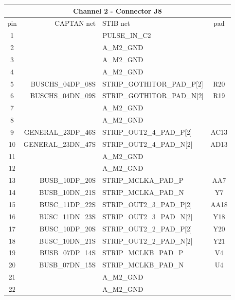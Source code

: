 \documentclass[11pt]{article}
\begin{document}
\begin{table}
\begin{center}
\scriptsize
\begin{tabular}{|c|r|l|c|} \hline
\multicolumn{4}{|c|}{Channel 2 - Connector J8} \\ \hline
pin & CAPTAN net    & STIB net & pad \\ \hline\hline
 1 &                  &  PULSE\_IN\_C2            & \\
 2 &                  &  A\_M2\_GND               & \\ \hline
 3 &                  &  A\_M2\_GND               & \\
 4 &                  &  A\_M2\_GND               & \\ \hline
 5 &  BUSCHS\_04DP\_08S &  STRIP\_GOTHITOR\_PAD\_P[2] & R20 \\
 6 &  BUSCHS\_04DN\_09S &  STRIP\_GOTHITOR\_PAD\_N[2] & R19 \\ \hline
 7 &                  &  A\_M2\_GND               & \\
 8 &                  &  A\_M2\_GND               & \\ \hline
 9 & GENERAL\_23DP\_46S &  STRIP\_OUT2\_4\_PAD\_P[2]   & AC13 \\
10 & GENERAL\_23DN\_47S &  STRIP\_OUT2\_4\_PAD\_N[2]   & AD13 \\ \hline
11 &                  &  A\_M2\_GND               & \\
12 &                  &  A\_M2\_GND               & \\ \hline
13 &    BUSB\_10DP\_20S &  STRIP\_MCLKA\_PAD\_P       & AA7 \\
14 &    BUSB\_10DN\_21S &  STRIP\_MCLKA\_PAD\_N       & Y7 \\ \hline
15 &    BUSC\_11DP\_22S &  STRIP\_OUT2\_3\_PAD\_P[2]   & AA18 \\
16 &    BUSC\_11DN\_23S &  STRIP\_OUT2\_3\_PAD\_N[2]   & Y18 \\ \hline
17 &    BUSC\_10DP\_20S &  STRIP\_OUT2\_2\_PAD\_P[2]   & Y20 \\
18 &    BUSC\_10DN\_21S &  STRIP\_OUT2\_2\_PAD\_N[2]   & Y21 \\ \hline
19 &    BUSB\_07DP\_14S &  STRIP\_MCLKB\_PAD\_P       & V4 \\
20 &    BUSB\_07DN\_15S &  STRIP\_MCLKB\_PAD\_N       & U4 \\ \hline
21 &                  &  A\_M2\_GND               & \\
22 &                  &  A\_M2\_GND               & \\ \hline

\end{tabular}
\end{center}
\end{table}
\end{document}
